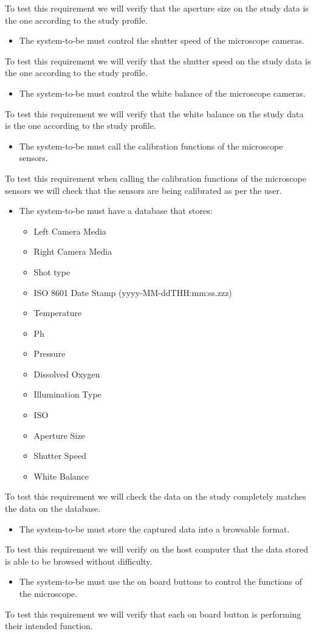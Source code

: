 To test this requirement we will verify that the aperture size on the study data is the one according to the study profile.
\begin{itemize}
    \item The system-to-be must control the shutter speed of the microscope cameras.
\end{itemize}
To test this requirement we will verify that the shutter speed on the study data is the one according to the study profile.
\begin{itemize}
    \item The system-to-be must control the white balance of the microscope cameras.
\end{itemize}
To test this requirement we will verify that the white balance on the study data is the one according to the study profile.
\begin{itemize}
    \item The system-to-be must call the calibration functions of the microscope sensors.
\end{itemize}
To test this requirement when calling the calibration functions of the microscope sensors we will check that the sensors are being calibrated as per the user.
\begin{itemize}
    \item The system-to-be must have a database that stores:
    \begin{itemize}
        \item Left Camera Media
        \item Right Camera Media
        \item Shot type
        \item ISO 8601 Date Stamp (yyyy-MM-ddTHH:mm:ss.zzz)
        \item Temperature
        \item Ph
        \item Pressure
        \item Dissolved Oxygen
        \item Illumination Type
        \item ISO
        \item Aperture Size
        \item Shutter Speed
        \item White Balance
    \end{itemize}
\end{itemize}
To test this requirement we will check the data on the study completely matches the data on the database.
\begin{itemize}
    \item The system-to-be must store the captured data into a browsable format.
\end{itemize}
To test this requirement we will verify on the host computer that the data stored is able to be browsed without difficulty.
\begin{itemize}
    \item The system-to-be must use the on board buttons to control the functions of the microscope.
\end{itemize}
To test this requirement we will verify that each on board button is performing their intended function.